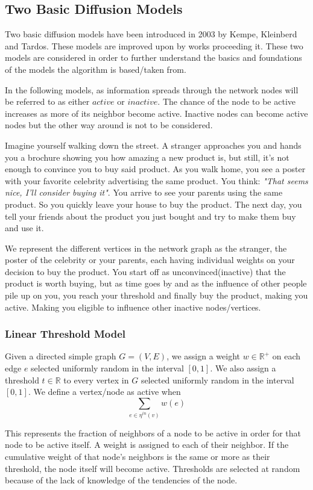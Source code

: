 \subsection{Two Basic Diffusion Models}
Two basic diffusion models have been introduced in 2003 by Kempe, Kleinberd and Tardos.\cite{Kempe} These models are improved upon by works proceeding it. These two models are considered in order to further understand the basics and foundations of the models the algorithm is based/taken from.


In the following models, as information spreads through the network nodes will be referred to as either $active$ or $inactive$. The chance of the node to be active increases as more of its neighbor become active. Inactive nodes can become active nodes but the other way around is not to be considered. 

Imagine yourself walking down the street. A stranger approaches you and hands you a brochure showing you how amazing a new product is, but still, it's not enough to convince you to buy said product. As you walk home, you see a poster with your favorite celebrity advertising the same product. You think: \textit{"That seems nice, I'll consider buying it"}. You arrive to see your parents using the same product. So you quickly leave your house to buy the product. The next day, you tell your friends about the product you just bought and try to make them buy and use it.

We represent the different vertices in the network graph as the stranger, the poster of the celebrity or your parents, each having individual weights on your decision to buy the product. You start off as unconvinced(inactive) that the product is worth buying, but as time goes by and as the influence of other people pile up on you, you reach your threshold and finally buy the product, making you active. Making you eligible to influence other inactive nodes/vertices.
\subsubsection{Linear Threshold Model}
Given a directed simple graph $G=(V,E)$, we assign a weight $w\in \mathbb{R}^{+}$ on each edge $e$ selected uniformly random in the interval $[0,1]$. We also assign a threshold $t \in \mathbb{R}$ to every vertex in $G$ selected uniformly random in the interval $[0,1]$.
We define a vertex/node as active when
		$$\sum_{e \in \eta^{in}(v)} w(e)$$

This represents the fraction of neighbors of a node to be active in order for that node to be active itself.  A weight is assigned to each of their neighbor. If the cumulative weight of that node's neighbors is the same or more as their threshold, the node itself will become active. Thresholds are selected at random because of the lack of knowledge of the tendencies of the node.\cite{Kempe} 
